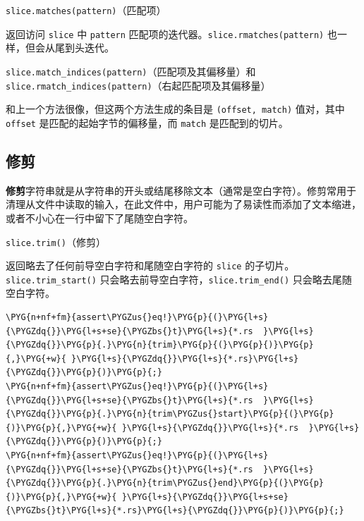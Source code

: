\begin{mySidenote}
\texttt{slice.matches(pattern)}（匹配项）
\end{mySidenote}

返回访问 \texttt{slice} 中 \texttt{pattern} 匹配项的迭代器。\texttt{slice.rmatches(pattern)} 也一样，但会从尾到头迭代。

\begin{myNote}
\texttt{slice.match\_indices(pattern)}（匹配项及其偏移量）和 \texttt{slice.rmatch\_indices(pattern)}（右起匹配项及其偏移量）
\end{myNote}

和上一个方法很像，但这两个方法生成的条目是 \texttt{(offset, match)} 值对，其中 \texttt{offset} 是匹配的起始字节的偏移量，而 \texttt{match} 是匹配到的切片。

\subsection{修剪}

\textbf{修剪}字符串就是从字符串的开头或结尾移除文本（通常是空白字符）。修剪常用于清理从文件中读取的输入，在此文件中，用户可能为了易读性而添加了文本缩进，或者不小心在一行中留下了尾随空白字符。

\begin{mySidenote}
\texttt{slice.trim()}（修剪）
\end{mySidenote}

返回略去了任何前导空白字符和尾随空白字符的 \texttt{slice} 的子切片。\texttt{slice.trim\_start()} 只会略去前导空白字符，\texttt{slice.trim\_end()} 只会略去尾随空白字符。

\begin{Verbatim}[commandchars=\\\{\},breaklines=true,breakanywhere=true,fontsize=\codefont,xleftmargin=17bp]
\PYG{n+nf+fm}{assert\PYGZus{}eq!}\PYG{p}{(}\PYG{l+s}{\PYGZdq{}}\PYG{l+s+se}{\PYGZbs{}t}\PYG{l+s}{*.rs  }\PYG{l+s}{\PYGZdq{}}\PYG{p}{.}\PYG{n}{trim}\PYG{p}{(}\PYG{p}{)}\PYG{p}{,}\PYG{+w}{ }\PYG{l+s}{\PYGZdq{}}\PYG{l+s}{*.rs}\PYG{l+s}{\PYGZdq{}}\PYG{p}{)}\PYG{p}{;}
\PYG{n+nf+fm}{assert\PYGZus{}eq!}\PYG{p}{(}\PYG{l+s}{\PYGZdq{}}\PYG{l+s+se}{\PYGZbs{}t}\PYG{l+s}{*.rs  }\PYG{l+s}{\PYGZdq{}}\PYG{p}{.}\PYG{n}{trim\PYGZus{}start}\PYG{p}{(}\PYG{p}{)}\PYG{p}{,}\PYG{+w}{ }\PYG{l+s}{\PYGZdq{}}\PYG{l+s}{*.rs  }\PYG{l+s}{\PYGZdq{}}\PYG{p}{)}\PYG{p}{;}
\PYG{n+nf+fm}{assert\PYGZus{}eq!}\PYG{p}{(}\PYG{l+s}{\PYGZdq{}}\PYG{l+s+se}{\PYGZbs{}t}\PYG{l+s}{*.rs  }\PYG{l+s}{\PYGZdq{}}\PYG{p}{.}\PYG{n}{trim\PYGZus{}end}\PYG{p}{(}\PYG{p}{)}\PYG{p}{,}\PYG{+w}{ }\PYG{l+s}{\PYGZdq{}}\PYG{l+s+se}{\PYGZbs{}t}\PYG{l+s}{*.rs}\PYG{l+s}{\PYGZdq{}}\PYG{p}{)}\PYG{p}{;}
\end{Verbatim}

